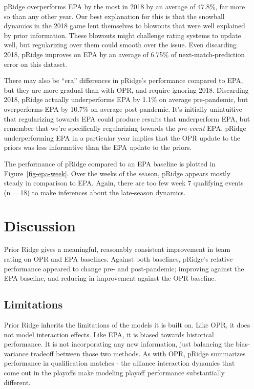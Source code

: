 \documentclass[
  12pt]{article}
\begin{document}
pRidge overperforms EPA by the most in 2018 by an average of 47.8\%, far
more so than any other year. Our best explanation for this is that the
snowball dynamics in the 2018 game lent themselves to blowouts that were
well explained by prior information. These blowouts might challenge
rating systems to update well, but regularizing over them could smooth
over the issue. Even discarding 2018, pRidge improves on EPA by an
average of 6.75\% of next-match-prediction error on this dataset.

There may also be ``era'' differences in pRidge's performance compared
to EPA, but they are more gradual than with OPR, and require ignoring
2018. Discarding 2018, pRidge actually underperforms EPA by 1.1\% on
average pre-pandemic, but overperforms EPA by 10.7\% on average
post-pandemic. It's initially unintuitive that regularizing towards EPA
could produce results that underperform EPA, but remember that we're
specifically regularizing towards the \emph{pre-event} EPA. pRidge
underperforming EPA in a particular year implies that the OPR update to
the priors was less informative than the EPA update to the priors.

The performance of pRidge compared to an EPA baseline is plotted in
Figure~\ref{fig-epa-week}. Over the weeks of the season, pRidge appears
mostly steady in comparison to EPA. Again, there are too few week 7
qualifying events (n = 18) to make inferences about the late-season
dynamics.

\section{Discussion}\label{discussion}

Prior Ridge gives a meaningful, reasonably consistent improvement in
team rating on OPR and EPA baselines. Against both baselines, pRidge's
relative performance appeared to change pre- and post-pandemic;
improving against the EPA baseline, and reducing in improvement against
the OPR baseline.

\subsection{Limitations}\label{limitations}

Prior Ridge inherits the limitations of the models it is built on. Like
OPR, it does not model interaction effects. Like EPA, it is biased
towards historical performance. It is not incorporating any new
information, just balancing the bias-variance tradeoff between those two
methods. As with OPR, pRidge summarizes performance in qualification
matches - the alliance interaction dynamics that come out in the
playoffs make modeling playoff performance substantially different.
\end{document}
